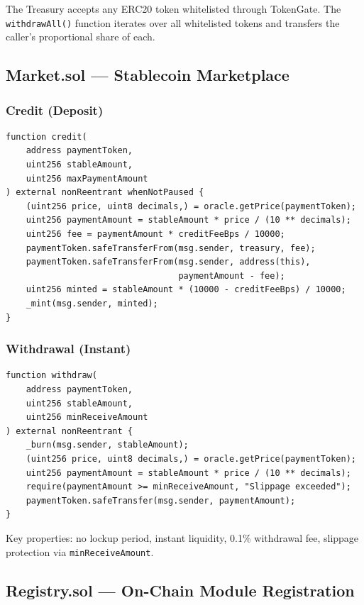 \documentclass[11pt,a4paper]{article}
\begin{document}
The Treasury accepts any ERC20 token whitelisted through TokenGate. The \texttt{withdrawAll()} function iterates over all whitelisted tokens and transfers the caller's proportional share of each.

\subsection{Market.sol --- Stablecoin Marketplace}

\subsubsection{Credit (Deposit)}

\begin{lstlisting}[style=solidity]
function credit(
    address paymentToken,
    uint256 stableAmount,
    uint256 maxPaymentAmount
) external nonReentrant whenNotPaused {
    (uint256 price, uint8 decimals,) = oracle.getPrice(paymentToken);
    uint256 paymentAmount = stableAmount * price / (10 ** decimals);
    uint256 fee = paymentAmount * creditFeeBps / 10000;
    paymentToken.safeTransferFrom(msg.sender, treasury, fee);
    paymentToken.safeTransferFrom(msg.sender, address(this),
                                  paymentAmount - fee);
    uint256 minted = stableAmount * (10000 - creditFeeBps) / 10000;
    _mint(msg.sender, minted);
}
\end{lstlisting}

\subsubsection{Withdrawal (Instant)}

\begin{lstlisting}[style=solidity]
function withdraw(
    address paymentToken,
    uint256 stableAmount,
    uint256 minReceiveAmount
) external nonReentrant {
    _burn(msg.sender, stableAmount);
    (uint256 price, uint8 decimals,) = oracle.getPrice(paymentToken);
    uint256 paymentAmount = stableAmount * price / (10 ** decimals);
    require(paymentAmount >= minReceiveAmount, "Slippage exceeded");
    paymentToken.safeTransfer(msg.sender, paymentAmount);
}
\end{lstlisting}

Key properties: no lockup period, instant liquidity, 0.1\% withdrawal fee, slippage protection via \texttt{minReceiveAmount}.

\subsection{Registry.sol --- On-Chain Module Registration}
\end{document}
